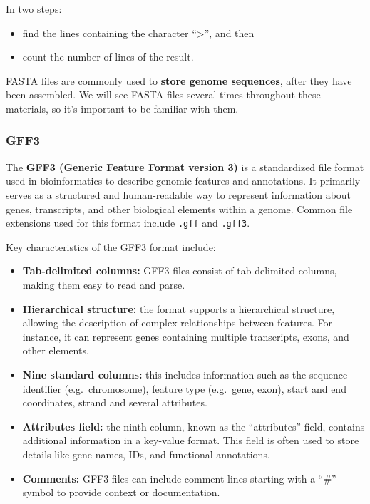 \documentclass[
]{article}
\providecommand{\tightlist}{%
  \setlength{\itemsep}{0pt}\setlength{\parskip}{0pt}}
\begin{document}
In two steps:

\begin{itemize}
\tightlist
\item
  find the lines containing the character ``\textgreater{}'', and then
\item
  count the number of lines of the result.
\end{itemize}

FASTA files are commonly used to \textbf{store genome sequences}, after
they have been assembled. We will see FASTA files several times
throughout these materials, so it's important to be familiar with them.

\subsubsection{GFF3}\label{gff3}

The \textbf{GFF3 (Generic Feature Format version 3)} is a standardized
file format used in bioinformatics to describe genomic features and
annotations. It primarily serves as a structured and human-readable way
to represent information about genes, transcripts, and other biological
elements within a genome. Common file extensions used for this format
include \texttt{.gff} and \texttt{.gff3}.

Key characteristics of the GFF3 format include:

\begin{itemize}
\tightlist
\item
  \textbf{Tab-delimited columns:} GFF3 files consist of tab-delimited
  columns, making them easy to read and parse.
\item
  \textbf{Hierarchical structure:} the format supports a hierarchical
  structure, allowing the description of complex relationships between
  features. For instance, it can represent genes containing multiple
  transcripts, exons, and other elements.
\item
  \textbf{Nine standard columns:} this includes information such as the
  sequence identifier (e.g.~chromosome), feature type (e.g.~gene, exon),
  start and end coordinates, strand and several attributes.
\item
  \textbf{Attributes field:} the ninth column, known as the
  ``attributes'' field, contains additional information in a key-value
  format. This field is often used to store details like gene names,
  IDs, and functional annotations.
\item
  \textbf{Comments:} GFF3 files can include comment lines starting with
  a ``\#'' symbol to provide context or documentation.
\end{itemize}
\end{document}
